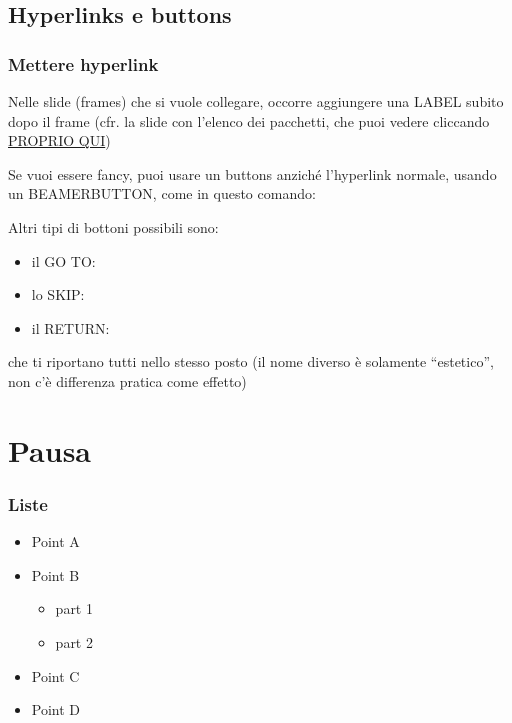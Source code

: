 \documentclass{beamer}[10]
\begin{document}
	\subsection{Hyperlinks e buttons}
	\begin{frame}
		\frametitle{Mettere hyperlink}
		Nelle slide (frames) che si vuole collegare, occorre aggiungere una LABEL subito dopo il frame (cfr. la slide con l'elenco dei pacchetti, che puoi vedere cliccando \hyperlink{label_della_slide}{PROPRIO QUI})
		
		Se vuoi essere fancy, puoi usare un buttons anziché l'hyperlink normale, usando un BEAMERBUTTON, come in questo comando: \hyperlink{label_della_slide}{}
		
		Altri tipi di bottoni possibili sono:
		\begin{itemize}
			\item il GO TO: \hyperlink{label_della_slide}{}
			\item lo SKIP: \hyperlink{label_della_slide}{}
			\item il RETURN: \hyperlink{label_della_slide}{}
		\end{itemize}
		che ti riportano tutti nello stesso posto (il nome diverso è solamente ``estetico'', non c'è differenza pratica come effetto)
	\end{frame}
	
	\section{Pausa}
	\begin{frame}
		\frametitle{Liste}
		\begin{itemize}
			\pause
			\item Point A
			\pause
			\item Point B
			\begin{itemize}
				\pause
				\item part 1
				\pause
				\item part 2
			\end{itemize}
			\pause
			\item Point C
			\pause
			\item Point D
		\end{itemize}
	\end{frame}
	
	
\end{document}
